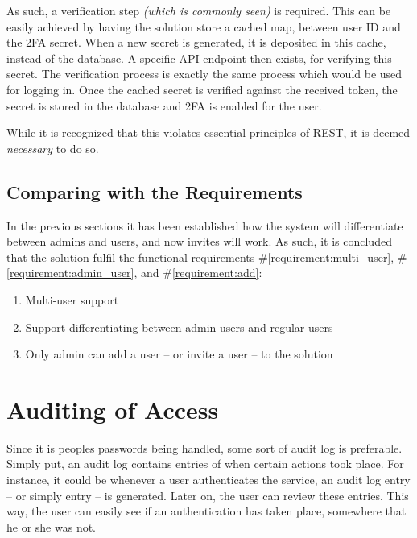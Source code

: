 			As such, a verification step \emph{(which is commonly seen)} is required. This can be easily achieved by having the solution store a cached map, between user ID and the 2FA secret. When a new secret is generated, it is deposited in this cache, instead of the database. A specific API endpoint then exists, for verifying this secret. The verification process is exactly the same process which would be used for logging in. Once the cached secret is verified against the received token, the secret is stored in the database and 2FA is enabled for the user.

			While it is recognized that this violates essential principles of REST, it is deemed \emph{necessary} to do so.


		\subsection{Comparing with the Requirements}
			\label{requirement:fulfilled:multi_user}
			\label{requirement:fulfilled:admin_user}
			\label{requirement:fulfilled:add}
			In the previous sections it has been established how the system will differentiate between admins and users, and now invites will work. As such, it is concluded that the solution fulfil the functional requirements \#\ref{requirement:multi_user}, \#\ref{requirement:admin_user}, and \#\ref{requirement:add}:

			\vspace{-3ex}\begin{enumerate}
				\setlength\itemsep{0.1em}
				\setcounter{enumi}{2-1}
				\item Multi-user support
				\item Support differentiating between admin users and regular users
				\setcounter{enumi}{6-1}
				\item Only admin can add a user -- or invite a user -- to the solution
			\end{enumerate}

	\section{Auditing of Access}
		\label{sec:audit}
		Since it is peoples passwords being handled, some sort of audit log is preferable. Simply put, an audit log contains entries of when certain actions took place. For instance, it could be whenever a user authenticates the service, an audit log entry -- or simply entry -- is generated. Later on, the user can review these entries. This way, the user can easily see if an authentication has taken place, somewhere that he or she was not.

